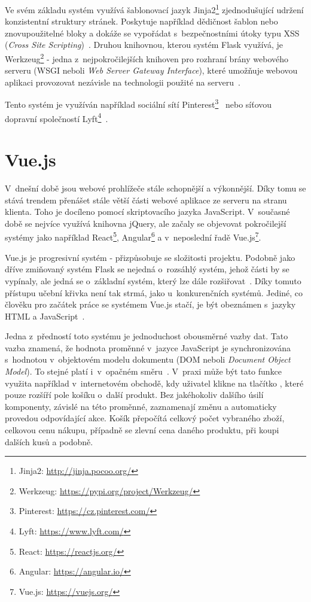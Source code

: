 Ve svém základu systém využívá šablonovací jazyk Jinja2\footnote{Jinja2: \url{http://jinja.pocoo.org/}} zjednodušující udržení konzistentní struktury stránek. Poskytuje například dědičnost šablon nebo znovupoužitelné bloky a dokáže se vypořádat s~bezpečnostními útoky typu XSS (\emph{Cross Site Scripting})~\cite{bib:jinja}.
Druhou knihovnou, kterou systém Flask využívá, je Werkzeug\footnote{Werkzeug: \url{https://pypi.org/project/Werkzeug/}} - jedna z~nejpokročilejších knihoven pro rozhraní brány webového serveru (WSGI neboli \emph{Web Server Gateway Interface}), které umožňuje webovou aplikaci provozovat nezávisle na technologii použité na serveru~\cite{bib:flask-pep}.

Tento systém je využíván například sociální sítí Pinterest\footnote{Pinterest: \url{https://cz.pinterest.com/}}~\cite{bib:flask-pinterest}
nebo síťovou dopravní společností Lyft\footnote{Lyft: \url{https://www.lyft.com/}}~\cite{bib:flask-lyft}.



\section{Vue.js}\label{section:Vue.js}
V~dnešní době jsou webové prohlížeče stále schopnější a výkonnější. Díky tomu se stává trendem přenášet stále větší části webové aplikace ze serveru na stranu klienta. Toho je docíleno pomocí skriptovacího jazyka JavaScript. V~současné době se nejvíce využívá knihovna jQuery, %
ale začaly se objevovat pokročilejší systémy jako například React\footnote{React: \url{https://reactjs.org/}}, Angular\footnote{Angular: \url{https://angular.io/}} a v~neposlední řadě Vue.js\footnote{Vue.js: \url{https://vuejs.org/}}.

Vue.js je progresivní systém - přizpůsobuje se složitosti projektu. Podobně jako dříve zmiňovaný systém Flask se nejedná o~rozsáhlý systém, jehož části by se vypínaly, ale jedná se o~základní systém, který lze dále rozšiřovat~\cite{bib:vue-progressive}.
Díky tomuto přístupu učební křivka není tak strmá, jako u~konkurenčních systémů. Jediné, co člověku pro začátek práce se systémem Vue.js stačí, je být obeznámen s~jazyky HTML a JavaScript~\cite{bib:vue-curve}.

Jedna z~předností toto systému je jednoduchost obousměrné vazby dat. Tato vazba znamená, že hodnota proměnné v~jazyce JavaScript je synchronizována s~hodnotou v~objektovém modelu dokumentu (DOM neboli \emph{Document Object Model}). To stejné platí i~v~opačném směru~\cite{bib:vue-binding}.
V~praxi může být tato funkce využita například v~internetovém obchodě, kdy uživatel klikne na tlačítko , které pouze rozšíří pole košíku o~další produkt. Bez jakéhokoliv dalšího úsilí komponenty, závislé na této proměnné, zaznamenají změnu a automaticky provedou odpovídající akce. Košík přepočítá celkový počet vybraného zboží, celkovou cenu nákupu, případně se zlevní cena daného produktu, při koupi dalších kusů a podobně.


